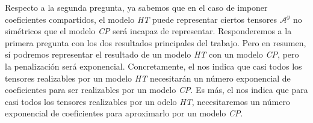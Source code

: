Respecto a la segunda pregunta, ya sabemos que en el caso de imponer coeficientes compartidos, el modelo \textit{HT} puede representar ciertos tensores $\mathcal{A}^y$ no simétricos que el modelo \textit{CP} será incapaz de representar. Responderemos a la primera pregunta con los dos resultados principales del trabajo. Pero en resumen, sí podremos representar el resultado de un modelo \textit{HT} con un modelo \textit{CP}, pero la penalización será exponencial. Concretamente, el  nos indica que casi todos los tensores realizables por un modelo \textit{HT} necesitarán un número exponencial de coeficientes para ser realizables por un modelo \textit{CP}. Es más, el  nos indica que para casi todos los tensores realizables por un odelo \textit{HT}, necesitaremos un número exponencial de coeficientes para aproximarlo por un modelo \textit{CP}.
